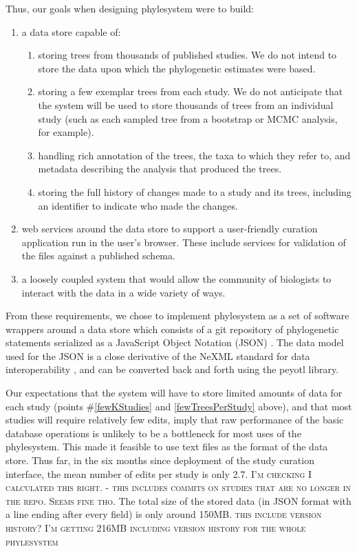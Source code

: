 \documentclass{bioinfo}
\newcommand{\ps}{phylesystem\xspace}
\newcommand{\js}{JavaScript\xspace}
\newcommand{\ejmcomment}[1]{{\color{green} \textsc{#1}}\xspace}
\newcommand{\jarcomment}[1]{{\color{yellow} \textsc{#1}}\xspace}
\begin{document}
Thus, our goals when designing \ps were to build: 
\begin{enumerate}
    \item  a data store capable of:
        \begin{enumerate}
            \item \label{fewKStudies} storing trees from thousands of published studies. We do not intend to store the 
                data upon which the phylogenetic estimates were based.
            \item \label{fewTreesPerStudy} storing a few exemplar trees from each study. We do not anticipate that the system will be used 
                to store thousands of trees from 
                an individual study (such as each sampled tree from a bootstrap or MCMC analysis, for example).
            \item \label{richAnnot} handling rich annotation of the trees, the taxa to which they refer to, and metadata describing 
                the analysis that produced the trees.
            \item \label{history} storing the full history of changes made to a study and its trees,
                including an identifier to indicate who made the changes.
        \end{enumerate}
    \item \label{ws} web services around the data store to support a user-friendly curation application run in the user's browser. These include services for validation of the files against a published schema.
    \item \label{looseOpen} a loosely coupled system that would allow the community of biologists to interact with the data in a wide variety of ways.
\end{enumerate}
From these requirements, we chose to implement \ps as a set of software wrappers around a data store
    which consists of a git \citep{git} repository of phylogenetic statements serialized as a \js Object Notation (JSON) \citep{Crockford2006}.
The data model used for the JSON is a close derivative of the NeXML standard for data interoperability \citep{NeXML},
  and can be converted back and forth using the peyotl library.

Our expectations that the system will have to store limited amounts of data for each study 
    (points \#\ref{fewKStudies} and \ref{fewTreesPerStudy} above), and that most
    studies will require relatively few edits, imply that
    raw performance of the basic database operations is unlikely to be a bottleneck for most
    uses of the \ps.
This made it feasible to use text files as the format of the data store.
Thus far, in the six months since deployment of the study curation interface, the mean number of edits 
    per study is only 2.7. \ejmcomment{I'm checking I calculated this right. - this includes commits on studies that are no longer in the repo. Seems fine tho.}
The total size of the stored data (in JSON format with a line ending after 
    every field) is only around 150MB.  \jarcomment{ this include version history?}
    \ejmcomment{I'm getting 216MB including version history for the whole phylesystem}
\end{document}
